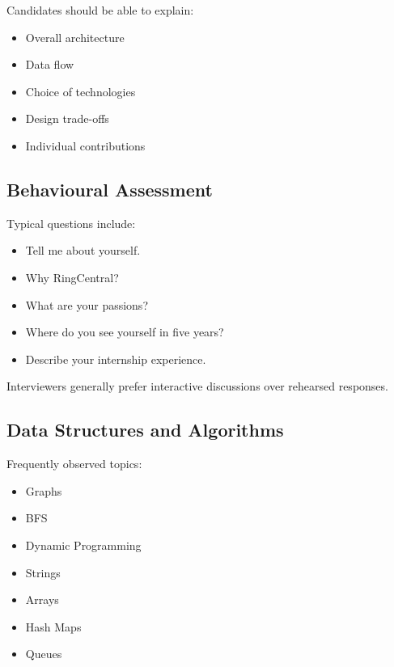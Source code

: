 \documentclass[11pt,a4paper]{article}
\begin{document}
Candidates should be able to explain:

\begin{itemize}
	\item Overall architecture
	\item Data flow
	\item Choice of technologies
	\item Design trade-offs
	\item Individual contributions
\end{itemize}


\subsection{Behavioural Assessment}

Typical questions include:

\begin{itemize}
	\item Tell me about yourself.
	\item Why RingCentral?
	\item What are your passions?
	\item Where do you see yourself in five years?
	\item Describe your internship experience.
\end{itemize}

Interviewers generally prefer interactive discussions over rehearsed responses.


\subsection{Data Structures and Algorithms}

Frequently observed topics:

\begin{itemize}
	\item Graphs
	\item BFS
	\item Dynamic Programming
	\item Strings
	\item Arrays
	\item Hash Maps
	\item Queues
\end{itemize}

\end{document}
